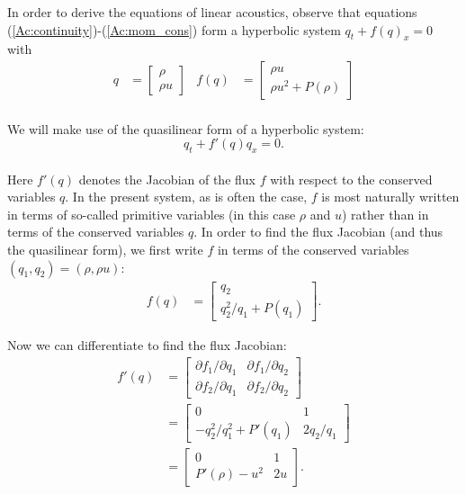 \documentclass{SIAMbook2016}
\begin{document}
In order to derive the equations of linear acoustics, observe that
equations (\ref{Ac:continuity})-(\ref{Ac:mom_cons}) form a hyperbolic
system \(q_t+f(q)_x=0\) with\\
\begin{align*}
q & = \begin{bmatrix} \rho \\ \rho u \end{bmatrix} & 
f(q) & = \begin{bmatrix} \rho u \\ \rho u^2 + P(\rho) \end{bmatrix}
\end{align*}\\
We will make use of the quasilinear form of a hyperbolic system:
\[q_t + f'(q) q_x = 0.\]\\
Here \(f'(q)\) denotes the Jacobian of the flux \(f\) with respect to
the conserved variables \(q\). In the present system, as is often the
case, \(f\) is most naturally written in terms of so-called primitive
variables (in this case \(\rho\) and \(u\)) rather than in terms of the
conserved variables \(q\). In order to find the flux Jacobian (and thus
the quasilinear form), we first write \(f\) in terms of the conserved
variables \((q_1,q_2) = (\rho, \rho u)\):\\
\begin{align}
f(q) & = \begin{bmatrix} q_2 \\ q_2^2/q_1 + P(q_1) \end{bmatrix}.
\end{align}

Now we can differentiate to find the flux Jacobian:\\
\begin{align*}
f'(q) & = \begin{bmatrix} \partial f_1/\partial q_1 & \partial f_1/\partial q_2 \\
                          \partial f_2/\partial q_1 & \partial f_2/\partial q_2 \end{bmatrix} \\
      & = \begin{bmatrix} 0 & 1 \\ -q_2^2/q_1^2 + P'(q_1) & 2q_2/q_1 \end{bmatrix} \\
      & = \begin{bmatrix} 0 & 1 \\ P'(\rho)-u^2 & 2u \end{bmatrix}.
\end{align*}
\end{document}
